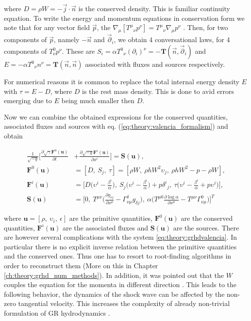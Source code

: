 \documentclass[11pt,a4paper,headinclude=true,DIV=14,BCOR=8mm,chapterprefix,listof=totoc,twoside,openright,abstracton]{scrbook}
\begin{document}
where $D=\rho W = -\vec{j}\cdot \vec{n}$ is the conserved density. This is familiar continuity equation. To write the energy and momentum equations in conservation form we note that for any vector field $\vec{p}$, the $\nabla_{\mu}[{T^{\mu}}_{\nu}p^{\nu}] = {T^{\mu}}_{\nu} \nabla_{\mu} p^{\nu}$ 
\cite{Rezzolla:2013}. Then, for two components of $\vec{p}$, namely $-\vec{n}$ and $\vec{\partial}_i$, we obtain 4 conversational laws, for 4 components of $T^{0}_{\nu}p^{\nu}$. These are $S_{i} = \alpha {T^0}_{\nu}(\partial_i)^{\nu}=-\boldsymbol{T}(\vec{n},\vec{\partial}_i)$ and $E = -\alpha{T^0}_{\nu}n^{\nu} = \boldsymbol{T}(\vec{n},\vec{n})$ associated with fluxes and sources respectively. 

For numerical reasons it is common to replace the total internal energy density $E$ with $\tau = E-D$, where $D$ is the rest mass density. This is done to avid errors emerging due to $E$ being much smaller then $D$.

Now we can combine the obtained expressions for the conserved quantities, associated fluxes and sources with eq. (\ref{eq:theory:valencia_formalism}) and obtain

\begin{align}
     \frac{1}{\sqrt{-g}}\Big[\frac{\partial\sqrt{\gamma}\boldsymbol{F}^{0}(\boldsymbol{u})}{\partial t} &+ \frac{\partial\sqrt{-g}\boldsymbol{F}^{i}(\boldsymbol{u})}{\partial x^i}\Big] = \boldsymbol{S}(\boldsymbol{u}), \\
     \boldsymbol{F}^0(\boldsymbol{u}) &= [D,\: S_j,\: \tau] = [\rho W,\: \rho h W^2 \upsilon_j,\: \rho h W^2 - p - \rho W],\\
     \boldsymbol{F}^i(\boldsymbol{u}) &= \Bigg[D\Big(\upsilon^{i}-\frac{\beta^i}{\alpha}\Big),\: S_{j}\Big(\upsilon^{i}-\frac{\beta^i}{\alpha}\Big)+p{\delta^i}_j ,\: \tau\Big(\upsilon^{i}-\frac{\beta^i}{\alpha}+p\upsilon^i\Big)\Bigg],\\
     \boldsymbol{S}(\boldsymbol{u}) &= \Bigg[0,\: T^{\mu\nu}\Big(\frac{\partial g_{\nu j}}{\partial x^{\mu}} - \Gamma^{\delta}_{\nu\mu}g_{\delta j}\Big),\: \alpha\Big(T^{\mu 0}\frac{\partial\log\alpha}{\partial x^{\mu}}-T^{\mu\nu}\Gamma^{0}_{\nu\mu}\Big)\Bigg]^T
     \label{eq:theory:grhdvalencia}
\end{align}

where $\boldsymbol{u} = [\rho,\: \upsilon_i,\: \epsilon]$ are the primitive quantities, $\boldsymbol{F}^0(\boldsymbol{u})$ are the conserved quantities, $\boldsymbol{F}^i(\boldsymbol{u})$ are the associated fluxes and $\boldsymbol{S}(\boldsymbol{u})$ are the sources. 
There are however several complications with the system \ref{eq:theory:grhdvalencia}. In particular there is no explicit inverse relation between the primitive quantities and the conserved ones. Thus one has to resort to root-finding algorithms in order to reconstruct them (More on this in Chapter \ref{ch:theory:grhd_num_methods}). In addition, it was pointed out that the $W$ couples the equation for the momenta in different direction \cite{Pons:2000,Rezzolla:2002ra,Rezzolla:2002cc,Aloy:2006rd}. This leads to the following behavior, the dynamics of the shock wave can be affected by the non-zero tangential velocity. This increases the complexity of already non-trivial formulation of GR hydrodynamics \cite{Mignone:2005ns,Zhang:2005qy}.
\end{document}
